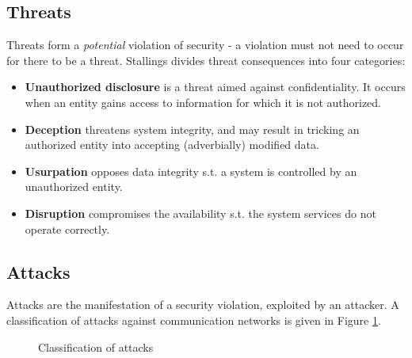\subsection{Threats}
Threats form a \textit{potential} violation of security - a violation must not need to occur for there to be a threat. Stallings \cite{stallingsThreat}
divides threat consequences into four categories:
\begin{itemize}
 \item \textbf{Unauthorized disclosure} is a threat aimed against confidentiality. It occurs when an entity gains access to information for which it is not authorized.
 \item \textbf{Deception} threatens system integrity, and may result in tricking an authorized entity into accepting (adverbially) modified data.
 \item \textbf{Usurpation} opposes data integrity s.t. a system is controlled by an unauthorized entity.
  \item \textbf{Disruption} compromises the availability s.t. the system services do not operate correctly.
\end{itemize}

\subsection{Attacks}\label{sec:attacks}
Attacks are the manifestation of a security violation, exploited by an attacker. 
A classification of attacks against communication networks is given in Figure \ref{fig:attacks}.  

\begin{figure}[h]
    \centering
{}
\caption{Classification of attacks}
    \label{fig:attacks}
\end{figure}

